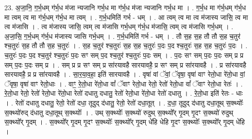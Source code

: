 \documentclass[17pt]{extarticle}
\begin{document}
23. अ॒जा॒नि॒ ग॒र्भ॒धम् ग॑र्भ॒ध म॑जा न्यजानि गर्भ॒ध मा ग॑र्भ॒ध म॑जा न्यजानि गर्भ॒ध मा । . ग॒र्भ॒ध मा ग॑र्भ॒धम् ग॑र्भ॒ध मा त्वम् त्व मा ग॑र्भ॒धम् ग॑र्भ॒ध मा त्वम् । . ग॒र्भ॒धमिति॑ गर्भ - धम् । . आ त्वम् त्व मा त्व म॑जास्य जासि॒ त्व मा त्व म॑जासि । . त्व म॑जास्य जासि॒ त्वम् त्व म॑जासि गर्भ॒धम् ग॑र्भ॒ध म॑जासि॒ त्वम् त्व म॑जासि गर्भ॒धम् । . अ॒जा॒सि॒ ग॒र्भ॒धम् ग॑र्भ॒ध म॑जास्य जासि गर्भ॒धम् । . ग॒र्भ॒धमिति॑ गर्भ - धम् । . तौ स॒ह स॒ह तौ तौ स॒ह च॒तुर॑ श्च॒तुरः॑ स॒ह तौ तौ स॒ह च॒तुरः॑ । . स॒ह च॒तुर॑ श्च॒तुरः॑ स॒ह स॒ह च॒तुरः॑ प॒दः प॒द श्च॒तुरः॑ स॒ह स॒ह च॒तुरः॑ प॒दः । . च॒तुरः॑ प॒दः प॒द श्च॒तुर॑ श्च॒तुरः॑ प॒दः सꣳ सम् प॒द श्च॒तुर॑ श्च॒तुरः॑ प॒दः सम् । . प॒दः सꣳ सम् प॒दः प॒दः सम् प्र प्र सम् प॒दः प॒दः सम् प्र । . सम् प्र प्र सꣳ सम् प्र सा॑रयावहै सारयावहै॒ प्र सꣳ सम् प्र सा॑रयावहै । . प्र सा॑रयावहै सारयावहै॒ प्र प्र सा॑रयावहै । . सा॒र॒या॒व॒हा॒ इति॑ सारयावहै । . वृषा॑ वां ॅवां॒ ॅवृषा॒ वृषा॑ वाꣳ रेतो॒धा रे॑तो॒धा वां॒ ॅवृषा॒ वृषा॑ वाꣳ रेतो॒धाः । . वाꣳ॒॒ रे॒तो॒धा रे॑तो॒धा वां᳚ ॅवाꣳ रेतो॒धा रेतो॒ रेतो॑ रेतो॒धा वां᳚ ॅवाꣳ रेतो॒धा रेतः॑ । . रे॒तो॒धा रेतो॒ रेतो॑ रेतो॒धा रे॑तो॒धा रेतो॑ दधातु दधातु॒ रेतो॑ रेतो॒धा रे॑तो॒धा रेतो॑ दधातु । . रे॒तो॒धा इति॑ रेतः - धाः । . रेतो॑ दधातु दधातु॒ रेतो॒ रेतो॑ दधा॒ तूदुद् द॑धातु॒ रेतो॒ रेतो॑ दधा॒तूत् । . द॒धा॒ तूदुद् द॑धातु दधा॒तूथ् स॒क्थ्योः᳚ स॒क्थ्यो॑रुद् द॑धातु दधा॒तूथ् स॒क्थ्योः᳚ । . उथ् स॒क्थ्योः᳚ स॒क्थ्यो॑ रुदुथ् स॒क्थ्यो᳚र् गृ॒दम् गृ॒दꣳ स॒क्थ्यो॑ रुदुथ् स॒क्थ्यो᳚र् गृ॒दम् । . स॒क्थ्यो᳚र् गृ॒दम् गृ॒दꣳ स॒क्थ्योः᳚ स॒क्थ्यो᳚र् गृ॒दम् धे॑हि धेहि गृ॒दꣳ स॒क्थ्योः᳚ स॒क्थ्यो᳚र् गृ॒दम् धे॑हि । \newline
\end{document}
